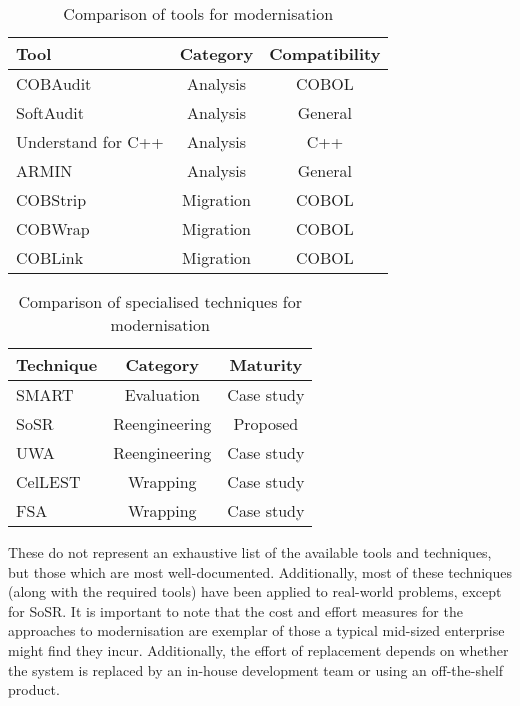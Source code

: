 \documentclass[12pt,journal,compsoc]{IEEEtran}
\begin{document}
\begin{table}[h!]
\caption{Comparison of tools for modernisation}
\label{table:tools}
\centering
\begin{tabular}{| l | c | c |}
  \hline
  \textbf{Tool} & \textbf{Category} & \textbf{Compatibility} \\ \hline
  COBAudit & Analysis & COBOL \\ \hline
  SoftAudit & Analysis & General \\ \hline
  Understand for C++ & Analysis & C++ \\ \hline
  ARMIN & Analysis & General \\ \hline
  COBStrip & Migration & COBOL \\ \hline
  COBWrap & Migration & COBOL \\ \hline
  COBLink & Migration & COBOL \\ \hline
\end{tabular}
\end{table}

\begin{table}[h!]
\caption{Comparison of specialised techniques for modernisation}
\label{table:techniques}
\centering
\begin{tabular}{| l | c | c |}
  \hline
  \textbf{Technique} & \textbf{Category} & \textbf{Maturity} \\ \hline
  SMART & Evaluation & Case study \\ \hline
  SoSR & Reengineering & Proposed \\ \hline
  UWA & Reengineering & Case study \\ \hline
  CelLEST & Wrapping & Case study \\ \hline
  FSA & Wrapping & Case study \\ \hline
\end{tabular}
\end{table}

These do not represent an exhaustive list of the available tools and techniques, but those which are most well-documented. Additionally, most of these techniques (along with the required tools) have been applied to real-world problems, except for SoSR. It is important to note that the cost and effort measures for the approaches to modernisation are exemplar of those a typical mid-sized enterprise might find they incur. Additionally, the effort of replacement depends on whether the system is replaced by an in-house development team or using an off-the-shelf product.
\end{document}

